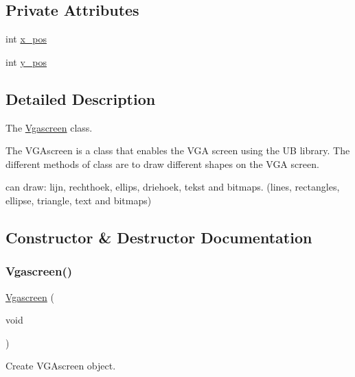 \subsection*{Private Attributes}
\begin{DoxyCompactItemize}
\item 
int \mbox{\hyperlink{class_vgascreen_af1617c91937fbd9d9d670940427d9b44}{x\+\_\+pos}}
\item 
int \mbox{\hyperlink{class_vgascreen_a375120430014d7e06dcc37d9ca4fcdb8}{y\+\_\+pos}}
\end{DoxyCompactItemize}


\subsection{Detailed Description}
The \mbox{\hyperlink{class_vgascreen}{Vgascreen}} class. 

The V\+G\+Ascreen is a class that enables the V\+GA screen using the UB library. The different methods of class are to draw different shapes on the V\+GA screen.

can draw\+: lijn, rechthoek, ellips, driehoek, tekst and bitmaps. (lines, rectangles, ellipse, triangle, text and bitmaps) 

\subsection{Constructor \& Destructor Documentation}
\mbox{\label{class_vgascreen_ad5914fac8c1af8491b92dfe780490191}} 
\subsubsection{\texorpdfstring{Vgascreen()}{Vgascreen()}}
{\footnotesize\ttfamily \mbox{\hyperlink{class_vgascreen}{Vgascreen}} (\begin{DoxyParamCaption}\item[{void}]{ }\end{DoxyParamCaption})}



Create V\+G\+Ascreen object. 



